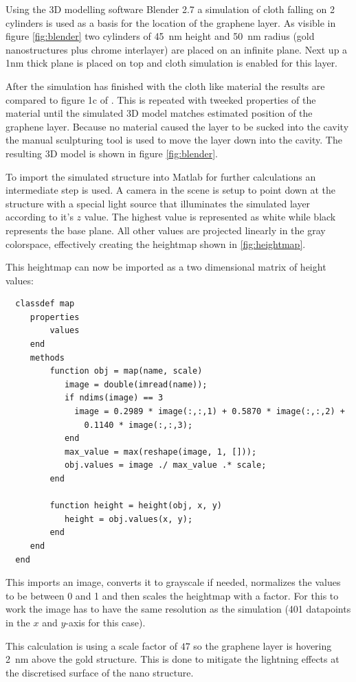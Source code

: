 Using the 3D modelling software Blender 2.7 a simulation of cloth falling on 2 cylinders is used as a basis for the location of the graphene layer. As visible in figure \ref{fig:blender} two cylinders of \SI{45}{nm} height and \SI{50}{nm} radius (gold nanostructures plus chrome interlayer) are placed on an infinite plane. Next up a 1nm thick plane is placed on top and cloth simulation is enabled for this layer.

After the simulation has finished with the cloth like material the results are compared to figure 1c of \cite{heeg}. This is repeated with tweeked properties of the material until the simulated 3D model matches estimated position of the graphene layer. Because no material caused the layer to be sucked into the cavity the manual sculpturing tool is used to move the layer down into the cavity. The resulting 3D model is shown in figure \ref{fig:blender}.

To import the simulated structure into Matlab for further calculations an intermediate step is used. A camera in the scene is setup to point down at the structure with a special light source that illuminates the simulated layer according to it's $z$ value. The highest value is represented as white while black represents the base plane. All other values are projected linearly in the gray colorspace, effectively creating the heightmap shown in \ref{fig:heightmap}.

This heightmap can now be imported as a two dimensional matrix of height values:
\begin{verbatim}
  classdef map
     properties
         values
     end
     methods
         function obj = map(name, scale)
            image = double(imread(name));
            if ndims(image) == 3
              image = 0.2989 * image(:,:,1) + 0.5870 * image(:,:,2) +
                0.1140 * image(:,:,3);
            end
            max_value = max(reshape(image, 1, []));
            obj.values = image ./ max_value .* scale;
         end

         function height = height(obj, x, y)
            height = obj.values(x, y);
         end
     end
  end
\end{verbatim}

This imports an image, converts it to grayscale if needed, normalizes the values to be between 0 and 1 and then scales the heightmap with a factor. For this to work the image has to have the same resolution as the simulation (401 datapoints in the $x$ and $y$-axis for this case).

This calculation is using a scale factor of $47$ so the graphene layer is hovering \SI{2}{nm} above the gold structure. This is done to mitigate the lightning effects at the discretised surface of the nano structure.
